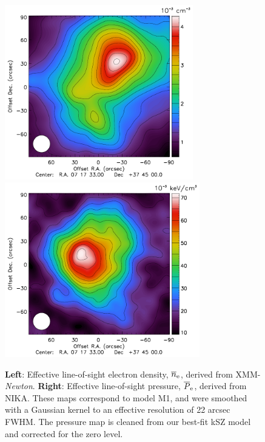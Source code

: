 \documentclass[twocolumn,traditabstract]{aa}
\begin{document}
\begin{figure}[h]
\centering
\includegraphics[height=7.6cm]{Figure/Thermo_N1.pdf}
\includegraphics[height=7.6cm]{Figure/Thermo_Pclean1.pdf}
\caption{\footnotesize{{\bf Left}: Effective line-of-sight electron density, $\overline{n}_{\rm e}$, derived from XMM-\textit{Newton}. {\bf Right}: Effective line-of-sight pressure, $\overline{P}_{\rm e}$, derived from NIKA. These maps correspond to model M1, and were smoothed with a Gaussian kernel to an effective resolution of 22 arcsec FWHM. The pressure map is cleaned from our best-fit kSZ model and corrected for the zero level.}}
\label{fig:Input_maps}
\end{figure}

\end{document}

